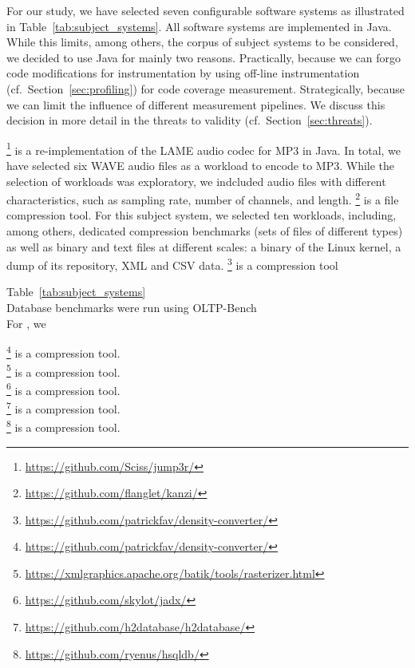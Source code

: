 For our study, we have selected seven configurable software systems as illustrated in Table~\ref{tab:subject_systems}. All software systems are implemented in Java. While this limits, among others, the corpus of subject systems to be considered, we decided to use Java for mainly two reasons. Practically, because we can forgo code modifications for instrumentation by using off-line instrumentation (cf.~Section~\ref{sec:profiling}) for code coverage measurement. Strategically, because we can limit the influence of different measurement pipelines. We discuss this decision in more detail in the threats to validity (cf.~Section~\ref{sec:threats}).

\footnote{\url{https://github.com/Sciss/jump3r/}} is a re-implementation of the LAME audio codec for MP3 in Java. In total, we have selected {\color{red}six} WAVE audio files as a workload to encode to MP3. While the selection of workloads was exploratory, we indcluded audio files with different characteristics, such as sampling rate, number of channels, and length. 
\footnote{\url{https://github.com/flanglet/kanzi/}} is a file compression tool. For this subject system, we selected {\color{red}ten} workloads, including, among others, dedicated compression benchmarks (sets of files of different types) as well as binary and text files at different scales: a binary of the Linux kernel, a dump of its repository, XML and CSV data. 
\footnote{\url{https://github.com/patrickfav/density-converter/}} is a compression tool


Table~\ref{tab:subject_systems}\\
Database benchmarks were run using OLTP-Bench\cite{difallah_oltp_2013}\\
For , we
\noindent

\footnote{\url{https://github.com/patrickfav/density-converter/}} is a compression tool.\\
\footnote{\url{https://xmlgraphics.apache.org/batik/tools/rasterizer.html}} is a compression tool.\\
\footnote{\url{https://github.com/skylot/jadx/}} is a compression tool.\\
\footnote{\url{https://github.com/h2database/h2database/}} is a compression tool.\\
\footnote{\url{https://github.com/ryenus/hsqldb/}} is a compression tool.\\

